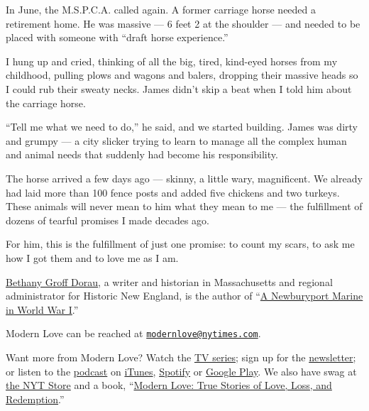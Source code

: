 In June, the M.S.P.C.A. called again. A former carriage horse needed a
retirement home. He was massive --- 6 feet 2 at the shoulder --- and
needed to be placed with someone with ``draft horse experience.''

I hung up and cried, thinking of all the big, tired, kind-eyed horses
from my childhood, pulling plows and wagons and balers, dropping their
massive heads so I could rub their sweaty necks. James didn't skip a
beat when I told him about the carriage horse.

``Tell me what we need to do,'' he said, and we started building. James
was dirty and grumpy --- a city slicker trying to learn to manage all
the complex human and animal needs that suddenly had become his
responsibility.

The horse arrived a few days ago --- skinny, a little wary, magnificent.
We already had laid more than 100 fence posts and added five chickens
and two turkeys. These animals will never mean to him what they mean to
me --- the fulfillment of dozens of tearful promises I made decades ago.

For him, this is the fulfillment of just one promise: to count my scars,
to ask me how I got them and to love me as I am.

\href{https://bethanygroffdorau.com/}{Bethany Groff Dorau}, a writer and
historian in Massachusetts and regional administrator for Historic New
England, is the author of
``\href{https://bethanygroffdorau.com/product/a-newburyport-marine-in-world-war-one/}{A
Newburyport Marine in World War I}.''

Modern Love can be reached at
\href{mailto:modernlove@nytimes.com}{\nolinkurl{modernlove@nytimes.com}}.

Want more from Modern Love? Watch the
\href{https://www.nytimes.com/2019/09/12/style/modern-love-tv-show-trailer.html}{TV
series}; sign up for the
\href{https://www.nytimes.com/newsletters/love-letter}{newsletter}; or
listen to the
\href{https://www.nytimes.com/column/modern-love-podcast}{podcast} on
\href{https://itunes.apple.com/us/podcast/modern-love/id1065559535?mt=2\&version=meter+at+0\&module=meter-Links\&pgtype=article\&contentId=\&mediaId=\&referrer=\&priority=true\&action=click\&contentCollection=meter-links-click}{iTunes},
\href{https://open.spotify.com/show/03Er7mSPq9IEewOgbPD3vO}{Spotify} or
\href{https://play.google.com/music/listen?u=0\#/ps/Iktqjbkz7bychbnofblw32dik64}{Google
Play}. We also have swag at
\href{https://store.nytimes.com/collections/modern-love}{the NYT Store}
and a book,
``\href{https://www.penguinrandomhouse.com/books/623036/modern-love-revised-and-updated-by-edited-by-daniel-jones-with-contributions-by-andrew-rannells-ayelet-waldman-amy-krouse-rosenthal-veronica-chambers-and-more/}{Modern
Love: True Stories of Love, Loss, and Redemption}.''

